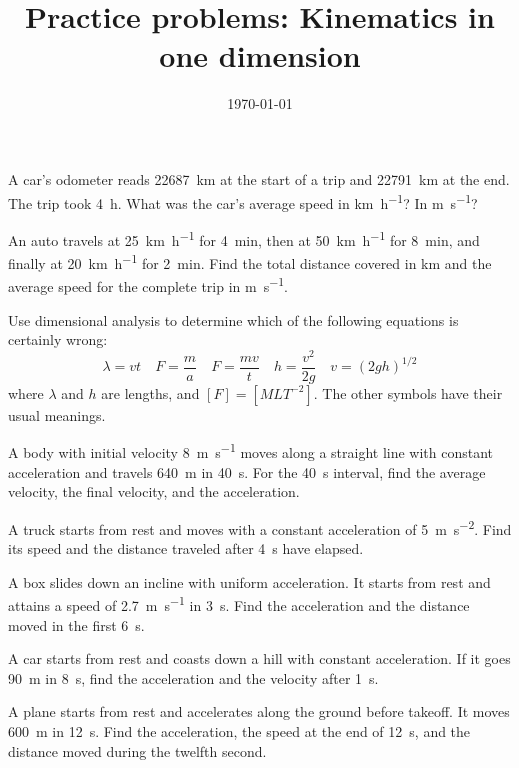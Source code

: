 \documentclass [hw]{exam}
\title{Practice problems: Kinematics in one dimension}
\author{\mobeardInstructorShort}
\date{\today}
\begin{document}
\maketitle

\begin{questions}
\question A car's odometer reads \SI{22687}{\kilo\meter} at the start of a trip and \SI{22791}{\kilo\meter} at the end. The trip took \SI{4}{\hour}. What was the car's average speed in \si{\kilo\meter\per\hour}? In \si{\meter\per\second}?

\question An auto travels at \SI{25}{\kilo\meter\per\hour} for \SI{4}{\minute}, then at \SI{50}{\kilo\meter\per\hour} for \SI{8}{\minute}, and finally at \SI{20}{\kilo\meter\per\hour} for \SI{2}{\minute}. Find the total distance covered in \si{\kilo\meter} and the average speed for the complete trip in \si{\meter\per\second}. 

\question Use dimensional analysis to determine which of the following equations is certainly wrong:
\begin{equation*}
\lambda=vt\quad F=\frac{m}{a}\quad F=\frac{mv}{t}\quad h=\frac{v^2}{2g}\quad v=(2gh)^{1/2}
\end{equation*} 
where $\lambda$ and $h$ are lengths, and $[F]=[MLT^{-2}]$. The other symbols have their usual meanings.

\question A body with initial velocity \SI{8}{\meter\per\second} moves along a straight line with constant acceleration and travels \SI{640}{\meter} in \SI{40}{\second}. For the \SI{40}{\second} interval, find the average velocity, the final velocity, and the acceleration. 

\question A truck starts from rest and moves with a constant acceleration of \SI{5}{\meter\per\second\squared}. Find its speed and the distance traveled after \SI{4}{\second} have elapsed. 

\question A box slides down an incline with uniform acceleration. It starts from rest and attains a speed of \SI{2.7}{\meter\per\second} in \SI{3}{\second}. Find the acceleration and the distance moved in the first \SI{6}{\second}.

\question A car starts from rest and coasts down a hill with constant acceleration. If it goes \SI{90}{\meter} in \SI{8}{\second}, find the acceleration and the velocity after \SI{1}{\second}.

\question A plane starts from rest and accelerates along the ground before takeoff. It moves \SI{600}{\meter} in \SI{12}{\second}. Find the acceleration, the speed at the end of \SI{12}{\second}, and the distance moved during the twelfth second. 


\end{questions}
\end{document}
